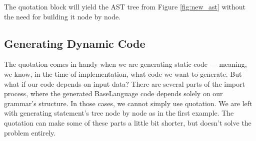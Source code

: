 The quotation block will yield the AST tree from Figure \ref{fig:new_ast} without the need for building it node by node.

\subsection{Generating Dynamic Code}

The quotation comes in handy when we are generating static code --- meaning, we know, in the time of implementation, what code we want to generate.
But what if our code depends on input data?
There are several parts of the import process, where the generated BaseLanguage code depends solely on our grammar's structure.
In those cases, we cannot simply use quotation.
We are left with generating statement's tree node by node as in the first example.
The quotation can make some of these parts a little bit shorter, but doesn't solve the problem entirely.